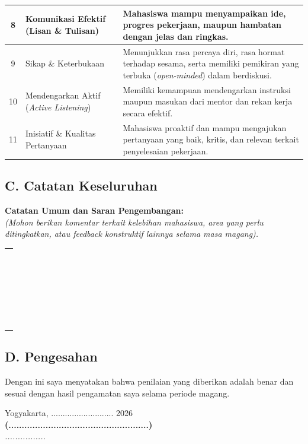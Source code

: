 \begin{longtable}{|c|p{4.5cm}|c|p{6.5cm}|}
	\hline
	8            & Komunikasi Efektif (Lisan \& Tulisan)          &                      & Mahasiswa mampu menyampaikan ide, progres pekerjaan, maupun hambatan dengan jelas dan ringkas.                                                  \\
	\hline
	9            & Sikap \& Keterbukaan                           &                      & Menunjukkan rasa percaya diri, rasa hormat terhadap sesama, serta memiliki pemikiran yang terbuka (\textit{open-minded}) dalam berdiskusi.      \\
	\hline
	10           & Mendengarkan Aktif (\textit{Active Listening}) &                      & Memiliki kemampuan mendengarkan instruksi maupun masukan dari mentor dan rekan kerja secara efektif.                                            \\
	\hline
	11           & Inisiatif \& Kualitas Pertanyaan               &                      & Mahasiswa proaktif dan mampu mengajukan pertanyaan yang baik, kritis, dan relevan terkait penyelesaian pekerjaan.                               \\
\end{longtable}

\subsection*{C. Catatan Keseluruhan}
\textbf{Catatan Umum dan Saran Pengembangan:}\\
\textit{(Mohon berikan komentar terkait kelebihan mahasiswa, area yang perlu ditingkatkan, atau feedback konstruktif lainnya selama masa magang).}
\par\vspace*{0.2cm}
\noindent
\begin{tabular}{@{}p{\textwidth}@{}}
	\rule{\textwidth}{0.4pt} \\[0.1cm]
	\rule{\textwidth}{0.4pt} \\[0.1cm]
	\rule{\textwidth}{0.4pt} \\[0.1cm]
	\rule{\textwidth}{0.4pt}
\end{tabular}

\vspace{1cm}
\subsection*{D. Pengesahan}
Dengan ini saya menyatakan bahwa penilaian yang diberikan adalah benar dan sesuai dengan hasil pengamatan saya selama periode magang.

\vspace{1cm}
\begin{flushright}
	Yogyakarta, ........................... 2026 \\[2cm]
	\textbf{(.....................................................)} \\
	\textit{................}
\end{flushright}
